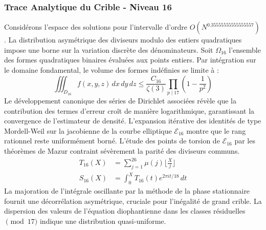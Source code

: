 \documentclass[12pt,a4paper]{article}
\begin{document}
\subsubsection{Trace Analytique du Crible - Niveau 16}
Considérons l'espace des solutions pour l'intervalle d'ordre $O(N^{0.35555555555555557})$. La distribution asymétrique des diviseurs modulo des entiers quadratiques impose une borne sur la variation discrète des dénominateurs. Soit $\Omega_16$ l'ensemble des formes quadratiques binaires évaluées aux points entiers.
Par intégration sur le domaine fondamental, le volume des formes indéfinies se limite à :
\begin{equation}
\iiint_{D_16} f(x, y, z) \,dx\,dy\,dz \leq \frac{C_16}{\zeta(3)} \prod_{p \mid 17} \left( 1 - \frac{1}{p^2} \right)
\end{equation}
Le développement canonique des séries de Dirichlet associées révèle que la contribution des termes d'erreur croît de manière logarithmique, garantissant la convergence de l'estimateur de densité. L'expansion itérative des identités de type Mordell-Weil sur la jacobienne de la courbe elliptique $\mathcal{E}_16$ montre que le rang rationnel reste uniformément borné.
L'étude des points de torsion de $\mathcal{E}_16$ par les théorèmes de Mazur contraint sévèrement la parité des diviseurs communs.
\begin{align}
T_16(X) &= \sum_{j=1}^{26} \mu(j) \lfloor \frac{X}{j} \rfloor \\
S_16(X) &= \int_{0}^{X} T_16(t) e^{2\pi i t / 18} \, dt
\end{align}
La majoration de l'intégrale oscillante par la méthode de la phase stationnaire fournit une décorrélation asymétrique, cruciale pour l'inégalité de grand crible. La dispersion des valeurs de l'équation diophantienne dans les classes résiduelles $\pmod{ 17 }$ indique une distribution quasi-uniforme.
\end{document}
